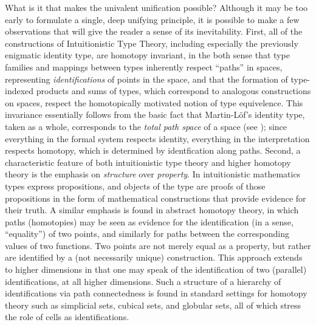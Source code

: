 \documentclass[11pt]{article}
\theoremstyle{remark}
\theoremstyle{definition}
\begin{document}
What is it that makes the univalent unification possible?  Although it may be too early to formulate a single, deep
unifying principle, it is possible to make a few observations that will give the reader a sense of its inevitability.
First, all of the constructions of Intuitionistic Type Theory, including especially the previously enigmatic identity
type, are homotopy invariant, in the both sense that type families and mappings between types inherently respect
``paths'' in spaces, representing \emph{identifications} of points in the space, and that the formation of type-indexed
products and sums of types, which correspond to analogous constructions on spaces, respect the homotopically motivated
notion of type equivelence.  This invariance essentially follows from the basic fact that Martin-L\"{o}f's identity
type, taken as a whole, corresponds to the \emph{total path space} of a space (see \cite{AW}); since everything in the
formal system respects identity, everything in the interpretation respects homotopy, which is determined by
identfication along paths.  Second, a characteristic feature of both intuitionistic type theory and higher homotopy
theory is the emphasis on \emph{structure} over \emph{property}.  In intuitionistic mathematics types express
propositions, and objects of the type are proofs of those propositions in the form of mathematical constructions that
provide evidence for their truth.  A similar emphasis is found in abstract homotopy theory, in which paths (homotopies)
may be seen as evidence for the identification (in a sense, ``equality'') of two points, and similarly for paths between
the corresponding values of two functions.  Two points are not merely equal as a property, but rather are identified by
a (not necessarily unique) construction.  This approach extends to higher dimensions in that one may speak of the
identification of two (parallel) identifications, at all higher dimensions.  Such a structure of a hierarchy of
identifications via path connectedness is found in standard settings for homotopy theory such as simplicial sets,
cubical sets, and globular sets, all of which stress the role of cells as identifications.
\end{document}
